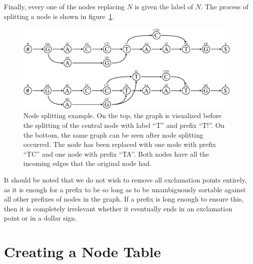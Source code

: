 \documentclass[a4paper,12pt,twoside,BCOR=10mm]{scrbook}
\begin{document}
Finally, every one of the nodes replacing $ N $ is given the label of $ N $. 
The process of splitting a node is shown in figure~\ref{fig:evo_fig_node_splitting}. \\
\begin{figure}[!htb]
\centering
\includegraphics[width=\textwidth]{evo_fig_node_splitting.pdf}
\caption[Node splitting example]{Node splitting example. On the top, the graph is visualized before the splitting of the central node with label \textup{“T”} and prefix \textup{“T!”}. On the bottom, the same graph can be seen after node splitting occurred. The node has been replaced with one node with prefix \textup{“TC”} and one node with prefix \textup{“TA”}. Both nodes have all the incoming edges that the original node had.} \label{fig:evo_fig_node_splitting}
\end{figure}
It should be noted that we do not wish to remove all exclamation points entirely, 
as it is enough for a prefix to be so long as to be unambiguously sortable against all 
other prefixes of nodes in the graph. If a prefix is long enough to ensure this, then 
it is completely irrelevant whether it eventually ends in an exclamation point or in a dollar sign.

\section{Creating a Node Table}
%
\end{document}
